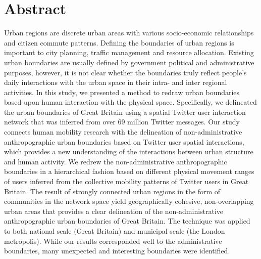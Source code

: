 \documentclass[10pt,letterpaper]{article}
\begin{document}
\section*{Abstract}
Urban regions are discrete urban areas with various socio-economic relationships and citizen commute patterns.
Defining the boundaries of urban regions is important to city planning, traffic management and resource allocation.
Existing urban boundaries are usually defined by government political and administrative purposes, however, it is not clear whether the boundaries truly reflect people's daily interactions with the urban space in their intra- and inter regional activities.
In this study, we presented a method to redraw urban boundaries based upon human interaction with the physical space.
Specifically, we delineated the urban boundaries of Great Britain using a spatial Twitter user interaction network that was inferred from over 69 million Twitter messages.
Our study connects human mobility research with the delineation of non-administrative anthropographic urban boundaries based on Twitter user spatial interactions, which provides a new understanding of the interactions between urban structure and human activity.
We redrew the non-administrative anthropographic boundaries in a hierarchical fashion based on different physical movement ranges of users inferred from the collective mobility patterns of Twitter users in Great Britain.
The result of strongly connected urban regions in the form of communities in the network space yield geographically cohesive, non-overlapping urban areas that provides a clear delineation of the non-administrative anthropographic urban boundaries of Great Britain.
The technique was applied to both national scale (Great Britain) and municipal scale (the London metropolis). 
While our results corresponded well to the administrative boundaries, many unexpected and interesting boundaries were identified.

\linenumbers
\end{document}
